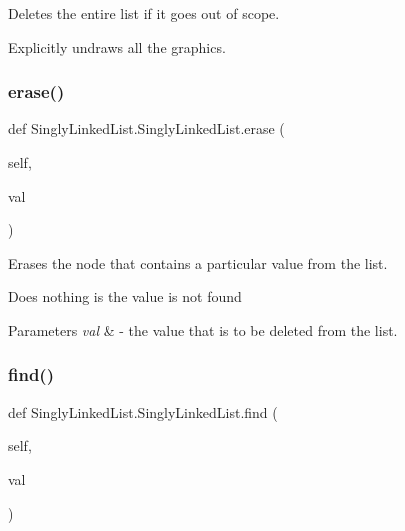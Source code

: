 Deletes the entire list if it goes out of scope. 

Explicitly undraws all the graphics. \mbox{\label{class_singly_linked_list_1_1_singly_linked_list_a994d4a1f5408fff85a372dd5d9c772fc}} 
\subsubsection{\texorpdfstring{erase()}{erase()}}
{\footnotesize\ttfamily def Singly\+Linked\+List.\+Singly\+Linked\+List.\+erase (\begin{DoxyParamCaption}\item[{}]{self,  }\item[{}]{val }\end{DoxyParamCaption})}



Erases the node that contains a particular value from the list. 

Does nothing is the value is not found


\begin{DoxyParams}{Parameters}
{\em val} & -\/ the value that is to be deleted from the list. \\
\hline
\end{DoxyParams}
\mbox{\label{class_singly_linked_list_1_1_singly_linked_list_a849c6542d4c83898efafc9bc1e0734e1}} 
\subsubsection{\texorpdfstring{find()}{find()}}
{\footnotesize\ttfamily def Singly\+Linked\+List.\+Singly\+Linked\+List.\+find (\begin{DoxyParamCaption}\item[{}]{self,  }\item[{}]{val }\end{DoxyParamCaption})}



